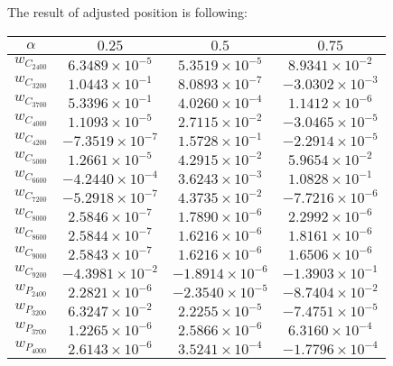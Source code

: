 The result of adjusted position is following:
\begin{table}[H]
    \centering
    \begin{tabular}{|c|c|c|c|}
        \hline
        $\alpha$ & $0.25$ & $0.5$ & $0.75$ \\
        \hline
        \(w_{C_{2400}}\)  & $6.3489 \times 10^{-5}$  & $5.3519 \times 10^{-5}$  & $8.9341 \times 10^{-2}$ \\
        \(w_{C_{3200}}\)  & $1.0443 \times 10^{-1}$  & $8.0893 \times 10^{-7}$  & $-3.0302 \times 10^{-3}$ \\
        \(w_{C_{3700}}\)  & $5.3396 \times 10^{-1}$  & $4.0260 \times 10^{-4}$  & $1.1412 \times 10^{-6}$ \\
        \(w_{C_{4000}}\)  & $1.1093 \times 10^{-5}$  & $2.7115 \times 10^{-2}$  & $-3.0465 \times 10^{-5}$ \\
        \(w_{C_{4200}}\)  & $-7.3519 \times 10^{-7}$ & $1.5728 \times 10^{-1}$  & $-2.2914 \times 10^{-5}$ \\
        \(w_{C_{5000}}\)  & $1.2661 \times 10^{-5}$  & $4.2915 \times 10^{-2}$  & $5.9654 \times 10^{-2}$ \\
        \(w_{C_{6600}}\)  & $-4.2440 \times 10^{-4}$ & $3.6243 \times 10^{-3}$  & $1.0828 \times 10^{-1}$ \\
        \(w_{C_{7200}}\)  & $-5.2918 \times 10^{-7}$ & $4.3735 \times 10^{-2}$  & $-7.7216 \times 10^{-6}$ \\
        \(w_{C_{8000}}\)  & $2.5846 \times 10^{-7}$  & $1.7890 \times 10^{-6}$  & $2.2992 \times 10^{-6}$ \\
        \(w_{C_{8600}}\) & $2.5844 \times 10^{-7}$  & $1.6216 \times 10^{-6}$  & $1.8161 \times 10^{-6}$ \\
        \(w_{C_{9000}}\) & $2.5843 \times 10^{-7}$  & $1.6216 \times 10^{-6}$  & $1.6506 \times 10^{-6}$ \\
        \(w_{C_{9200}}\) & $-4.3981 \times 10^{-2}$ & $-1.8914 \times 10^{-6}$ & $-1.3903 \times 10^{-1}$ \\
        \(w_{P_{2400}}\) & $2.2821 \times 10^{-6}$  & $-2.3540 \times 10^{-5}$ & $-8.7404 \times 10^{-2}$ \\
        \(w_{P_{3200}}\) & $6.3247 \times 10^{-2}$  & $2.2255 \times 10^{-5}$  & $-7.4751 \times 10^{-5}$ \\
        \(w_{P_{3700}}\) & $1.2265 \times 10^{-6}$  & $2.5866 \times 10^{-6}$  & $6.3160 \times 10^{-4}$ \\
        \(w_{P_{4000}}\) & $2.6143 \times 10^{-6}$  & $3.5241 \times 10^{-4}$  & $-1.7796 \times 10^{-4}$ \\

\end{tabular}
\end{table}
